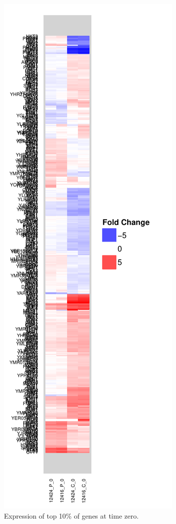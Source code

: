 \documentclass[letter]{article}\usepackage{graphicx, color}
\makeatletter
\def\maxwidth{ %
  \ifdim\Gin@nat@width>\linewidth
    \linewidth
  \else
    \Gin@nat@width
  \fi
}
\newenvironment{knitrout}{}{} %
\makeatother
\begin{document}
\begin{figure}[hbtp]
\centering
\begin{knitrout}
\color{fgcolor}\includegraphics[width=\maxwidth]{figure/p4} 
\end{knitrout}

\caption{Expression of top 10\% of genes at time zero.}
\end{figure}
\end{document}
